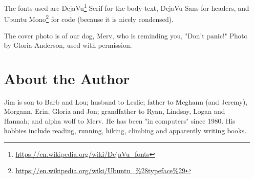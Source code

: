 \documentclass[10pt,american,]{book}
\renewcommand{\href}[2]{#2\footnote{\url{#1}}}
\numberwithin{figure}{chapter}
\begin{document}
The fonts used are
\href{https://en.wikipedia.org/wiki/DejaVu_fonts}{DejaVu} Serif for the
body text, DejaVu Sans for headers, and
\href{https://en.wikipedia.org/wiki/Ubuntu_\%28typeface\%29}{Ubuntu
Mono} for code (because it is nicely condensed).

The cover photo is of our dog, Merv, who is reminding you, "Don't
panic!" Photo by Gloria Anderson, used with permission.

\section*{About the Author}\label{about-the-author}

Jim is son to Barb and Lou; husband to Leslie; father to Meghann (and
Jeremy), Morgann, Erin, Gloria and Jon; grandfather to Ryan, Lindsay,
Logan and Hannah; and alpha wolf to Merv. He has been "in computers"
since 1980. His hobbies include reading, running, hiking, climbing and
apparently writing books.

\cleardoublepage
{}
\printindex
\end{document}
